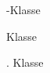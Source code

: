 \documentclass[
ngerman,
cdoldfont,
cdfont=false,
]{tudscrreprt}
\begin{document}
\begingroup
\let\protect\meaning\TUDScript
\endgroup

\meaning\xspace

\TUDScript-Klasse

\TUDScript Klasse

\TUDScript. Klasse

\meaning\xspace


\end{document}
